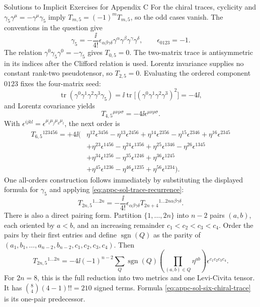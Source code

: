 \begin{bankssolutions}{Solutions to Implicit Exercises for Appendix C}
For the chiral traces, cyclicity and
$\gamma_5\gamma^\mu=-\gamma^\mu\gamma_5$ imply
$T_{m,5}=(-1)^mT_{m,5}$, so the odd cases vanish.  The conventions in the
question give
\[
 \gamma_5=-\frac{\ii}{4!}\epsilon_{\alpha\beta\gamma\delta}
 \gamma^\alpha\gamma^\beta\gamma^\gamma\gamma^\delta,
 \qquad \epsilon_{0123}=-1.
\]
The relation $\gamma^0\gamma_5\gamma^0=-\gamma_5$ gives
$T_{0,5}=0$.  The two-matrix trace is antisymmetric in its indices after
the Clifford relation is used.  Lorentz invariance supplies no constant
rank-two pseudotensor, so $T_{2,5}=0$.  Evaluating the ordered component
$0123$ fixes the four-matrix seed:
\[
 \operatorname{tr}(\gamma^0\gamma^1\gamma^2\gamma^3\gamma_5)
 =\ii\operatorname{tr}
  \bigl[(\gamma^0\gamma^1\gamma^2\gamma^3)^2\bigr]
 =-4\ii,
\]
and Lorentz covariance yields
\[
 T_{4,5}{}^{\mu\nu\rho\sigma}
 =-4\ii\epsilon^{\mu\nu\rho\sigma}.
\]
With $\epsilon^{ijkl}=\epsilon^{\mu_i\mu_j\mu_k\mu_l}$, the next order is
\begin{equation}
\begin{aligned}
 T_{6,5}{}^{123456}=+4\ii\bigl(&
 \eta^{12}\epsilon^{3456}-\eta^{13}\epsilon^{2456}
 +\eta^{14}\epsilon^{2356}-\eta^{15}\epsilon^{2346}
 +\eta^{16}\epsilon^{2345}\\
 &+\eta^{23}\epsilon^{1456}-\eta^{24}\epsilon^{1356}
 +\eta^{25}\epsilon^{1346}-\eta^{26}\epsilon^{1345}\\
 &+\eta^{34}\epsilon^{1256}-\eta^{35}\epsilon^{1246}
 +\eta^{36}\epsilon^{1245}\\
 &+\eta^{45}\epsilon^{1236}-\eta^{46}\epsilon^{1235}
 +\eta^{56}\epsilon^{1234}\bigr).
\end{aligned}
 \label{eq:appc-sol-six-chiral-trace}
\end{equation}
One all-orders construction follows immediately by substituting the
displayed formula for $\gamma_5$ and applying
\eqref{eq:appc-sol-trace-recurrence}:
\[
 T_{2n,5}{}^{1\ldots2n}
 =-\frac{\ii}{4!}\epsilon_{\alpha\beta\gamma\delta}
 T_{2n+4}{}^{1\ldots2n\alpha\beta\gamma\delta}.
\]
There is also a direct pairing form.  Partition
$\{1,\ldots,2n\}$ into $n-2$ pairs $(a,b)$, each oriented by $a<b$, and
an increasing remainder $c_1<c_2<c_3<c_4$.  Order the pairs by their
first entries and define
$\operatorname{sgn}(Q)$ as the parity of
$(a_1,b_1,\ldots,a_{n-2},b_{n-2},c_1,c_2,c_3,c_4)$.  Then
\begin{equation}
 T_{2n,5}{}^{1\ldots2n}
 =-4\ii(-1)^{n-2}\sum_Q\operatorname{sgn}(Q)
 \left(\prod_{(a,b)\in Q}\eta^{ab}\right)
 \epsilon^{c_1c_2c_3c_4}.
 \label{eq:appc-sol-chiral-pairings}
\end{equation}
For $2n=8$, this is the full reduction into two metrics and one
Levi-Civita tensor.  It has
$\binom84(4-1)!!=210$ signed terms.  Formula
\eqref{eq:appc-sol-six-chiral-trace} is its one-pair predecessor.


\end{bankssolutions}
